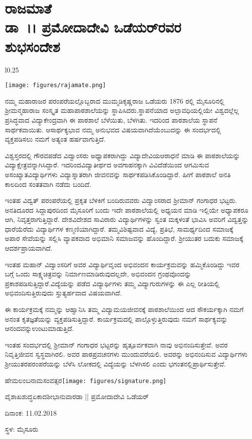 {\fontsize{14}{16}\selectfont

\chapter[ರಾಜಮಾತೆ ಡಾ~।। ಪ್ರಮೋದಾದೇವಿ ಒಡೆಯರ್ ರವರ ಶುಭಸಂದೇಶ]{ರಾಜಮಾತೆ\\ ಡಾ~।। ಪ್ರಮೋದಾದೇವಿ ಒಡೆಯರ್‌ರವರ\\ ಶುಭಸಂದೇಶ}

\begin{wrapfigure}{l}{0.25\textwidth}
\centerline{\texttt{[image: figures/rajamate.png]}}
\end{wrapfigure}	
ನಮ್ಮ ಮಹಾರಾಜರ ಪರಂಪರೆಯಲ್ಲೊಬ್ಬರಾದ ಮುಮ್ಮಡಿ\break ಕೃಷ್ಣರಾಜ ಒಡೆಯರು 1876 ರಲ್ಲಿ ಮೈಸೂರಿನಲ್ಲಿ  ಶ್ರೀಮನ್ಮಹಾ\-ರಾಜ ಸಂಸ್ಕೃತ ಮಹಾಪಾಠಶಾಲೆಯನ್ನು ಸ್ಥಾಪಿಸಿ\-ದರು.\break ಸ್ಥಾಪನೆಯಾದ ಅಲ್ಪಾವಧಿಯಲ್ಲಿಯೇ ವಿಶ್ವದಲ್ಲೆಲ್ಲ  ಪ್ರಸಿದ್ಧ\-ವಾದ ವಿದ್ಯಾಕೇಂದ್ರವಾಗಿ ಈ ಪಾಠಶಾಲೆ ಬೆಳೆಯಿತು, \hbox{ಬೆಳಗಿತು}. ಇದರಿಂದ ಪಾಠಶಾಲೆಯ ಸ್ಥಾಪನೆ ಸಾರ್ಥಕ\-ವಾಯಿತು. ಆ\break ಸಾರ್ಥಕ್ಯಭಾವ ನಮ್ಮ ಅನುಭವದ ವಿಷಯವಾಗಿದೆಯೆಂಬುದನ್ನು ಈ ಸಂದರ್ಭದಲ್ಲಿ ವ್ಯಕ್ತಪಡಿಸಲು ನಮಗೆ ಅತ್ಯಂತ ಹರ್ಷವಾಗುತ್ತಿದೆ.
\vskip 8pt

ವಿಶ್ವಸ್ತರದಲ್ಲಿ ಗೌರವಪಡೆದ ವಿದ್ವಾಂಸರು ಅಧ್ಯಾಪಕರಾಗಿದ್ದು ವಿದ್ಯಾದೇವಿಯ\break ಆರಾಧನೆ ಮಾಡಿ ಈ ಪಾಠಶಾಲೆಯನ್ನು ವಿದ್ಯಾಕ್ಷೇತ್ರವನ್ನಾಗಿಸಿದ್ದಾರೆ. ಇದರಿಂದ\break ವಿದ್ಯಾತೀರ್ಥದ ಅವಗಾಹನಕ್ಕಾಗಿ ವಿವಿದೆಡೆಯಿಂದ ಆಗಮಿಸುವ ಅಸಂಖ್ಯಾತ\break ವಿದ್ಯಾರ್ಥಿಗಳು ವಿದ್ಯಾಸ್ನಾತರಾಗಿ ಜೀವನವನ್ನು ಸಾರ್ಥಕಪಡಿಸಿಕೊಂಡಿದ್ದಾರೆ. ಹೀಗೆ ಪಾಠಶಾಲೆ ಅನತಿ ಕಾಲದಿಂದ ಸಂತತವಾಗಿ ನಡೆದು ಬಂದಿದೆ.
\vskip 8pt

ಇಂತಹ ವಿದ್ವತ್ ಪರಂಪರೆಯಲ್ಲಿ ಪ್ರಕೃತ ಬೆಳಕಿಗೆ ಬಂದಿರುವವರು ವಿದ್ವಾಂಸರಾದ ಶ್ರೀಮಾನ್ ಗಂಗಾಧರ ಭಟ್ಟರು.  ಅನತಿದೂರದ ಸಿದ್ದಾಪುರದಿಂದ ಮೈಸೂರಿಗೆ ಬಂದು ಇದೇ ಪಾಠಶಾಲೆಯಲ್ಲಿ ಅಧ್ಯಯನ ಮಾಡಿ ಇಲ್ಲಿಯೇ ಅಧ್ಯಾಪಕರೂ ಆಗಿ, ನಿವೃತ್ತರಾಗು\-ತ್ತಿದ್ದಾರೆ. ದೇಶ\enginline{-}ವಿದೇಶದ ಸಾವಿರಾರು ವಿದ್ಯಾರ್ಥಿಗಳನ್ನು ಸ್ವಂತ ಮಕ್ಕಳಂತೆ ಭಾವಿಸಿ ಅವರಿಗೆ ವಿದ್ವತ್ತನ್ನು ಧಾರೆಯೆರೆದು ವಿದ್ಯಾರ್ಥಿಗಳ ಕಣ್ಮಣಿಯಾಗಿದ್ದಾರೆ. ತಮ್ಮ\break ವಿಶಿಷ್ಟವಾದ ವಿದ್ಯೆ, ಪ್ರತಿಭೆ, ಸಾಮರ್ಥ್ಯದಿಂದ ಸಮಾಜಕ್ಕೆ ಅಪಾರ ಸೇವೆಯನ್ನು ಸಲ್ಲಿಸಿ ವ್ಯಾಪಕವಾದ ಅಭಿಮಾನಿ ಸಮಾಜವನ್ನು ಹೊಂದಿದ್ದಾರೆ. ಶ್ರೀಯುತರ ಬದುಕು ಸಮಾಜಕ್ಕೆ ಆದರ್ಶಪ್ರಾಯವಾಗಿದೆ. 

ಇಂತಹ ಮಹಾನ್ ವಿದ್ವಾಂಸರಿಗೆ ಅವರ ವಿದ್ಯಾರ್ಥಿವೃಂದ ಅಭಿವಂದನ ಕಾರ್ಯ\-ಕ್ರಮವನ್ನು ಹಮ್ಮಿಕೊಂಡಿದ್ದು ಇವರ ಬಗ್ಗೆ ಒಂದು ಸಾಕ್ಷ್ಯಚಿತ್ರವನ್ನು ನಿರ್ಮಾಣ\break ಮಾಡಿರುವುದಲ್ಲದೇ, ಅಭಿವಂದನ ಗ್ರಂಥವೊಂದನ್ನು ಪ್ರಕಾಶಪಡಿಸುತ್ತಿದ್ದಾರೆ.\break ವಿದ್ಯೆಯನ್ನು ಪಡೆದ ವಿದ್ಯಾರ್ಥಿಗಳು ತಮ್ಮ ವಿದ್ಯಾಗುರುಗಳನ್ನು ಈ ಎಲ್ಲ ರೀತಿಯಲ್ಲಿ ಅಭಿವಂದಿಸುತ್ತಿರುವುದು  ಸ್ತುತ್ಯರ್ಹವಾದ ವಿಷಯವಾಗಿದೆ. 

ಈ ಕಾರ್ಯಕ್ರಮಕ್ಕೆ ನಮ್ಮನ್ನು ಆಹ್ವಾನಿಸಿ ತಮ್ಮ ವಿದ್ಯಾಮಯಜೀವನಕ್ಕೆ ಪಾಠಶಾಲೆ\-ಯಿಂದ ಆದ ಸೌಕರ್ಯಕ್ಕಾಗಿ ನಮಗೆ ಅನಂತ ಕೃತಜ್ಞತೆಯನ್ನು \hbox{ವ್ಯಕ್ತಪಡಿಸುತ್ತಿದ್ದಾರೆ}. ಕಾರ್ಯಕ್ರಮದಲ್ಲಿ ಪಾಲ್ಗೊಳ್ಳುತ್ತಿರುವುದು ನಮಗೆ ಸಾರ್ಥಕ್ಯವನ್ನು ಆನಂದವನ್ನು\break ಉಂಟುಮಾಡುತ್ತಿದೆ.

ಇಂತಹ ಸಂದರ್ಭದಲ್ಲಿ ಶ್ರೀಮಾನ್ ಗಂಗಾಧರ ಭಟ್ಟರನ್ನು ಹೃತ್ಪೂರ್ವಕವಾಗಿ ನಾವು ಅಭಿನಂದಿಸುತ್ತೇವೆ. ಅವರ ನಿವೃತ್ತಿಜೀವನ ಸ್ವಸ್ಥವಾಗಿರಲಿ. ಅವರ ಪಾಠಪ್ರವಚನಗಳು ಮುಂದುವರೆಯಲಿ. ಅವರನ್ನು ಅಭಿನಂದಿಸುವ ವಿದ್ಯಾರ್ಥಿಗಳು ಶ್ರೀಯುತರ\break ಪರಂಪರೆಯನ್ನು ಬೆಳೆಸಿ ಲೋಕದಲ್ಲಿ ವಿದ್ಯೆಯನ್ನು ಬೆಳಗಿಸಲಿ ಎಂದು ಭಗಂತನಲ್ಲಿ\break ಪ್ರಾರ್ಥಿಸುತ್ತೇವೆ.
\bigskip

\noindent
ಹೇಮಲಂಬನಾಮಸಂವತ್ಸರ\hfill\texttt{[image: figures/signature.png]}

\noindent
ವೈಶಾಖ\enginline{-}ಶುದ್ಧ\enginline{-}ಏಕಾದಶೀ\enginline{-}ಭಾನುವಾರ\hfill ಡಾ || ಪ್ರಮೋದಾದೇವಿ ಒಡೆಯರ್

\noindent
ದಿನಾಂಕ: 11.02.2018							

\noindent
ಸ್ಥಳ: ಮೈಸೂರು
}
